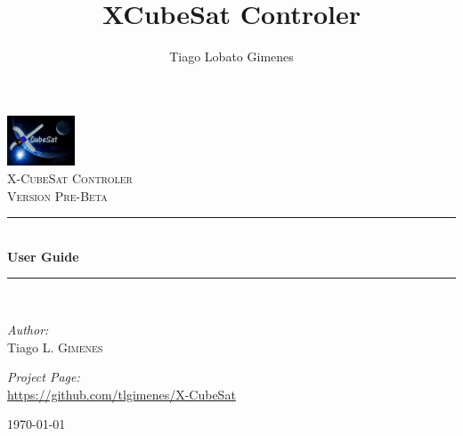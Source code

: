 \documentclass[pdftex,11pt,a4paper,titlepage]{report}
\author{Tiago Lobato Gimenes}
\title{XCubeSat Controler}
\newcommand{\HRule}{\rule{\linewidth}{0.5mm}}
\begin{document}
\begin{titlepage}
\begin{center}

\includegraphics[width=0.15\textwidth]{../images/CubeSat3.jpg}~\\[1cm]

\textsc{\LARGE X-CubeSat Controler}\\[1.5cm]

\textsc{\Large Version Pre-Beta}\\[0.5cm]

\HRule \\[0.4cm]
{ \huge \bfseries User Guide \\[0.4cm] }

\HRule \\[1.5cm]

\begin{minipage}{0.4\textwidth}
\begin{flushleft} \large
\emph{Author:}\\
Tiago \textsc{L. Gimenes}
\end{flushleft}
\end{minipage}
\begin{minipage}{0.4\textwidth}
\begin{flushright} \large
\emph{Project Page:} \\
\url{https://github.com/tlgimenes/X-CubeSat}
\end{flushright}
\end{minipage}

\vfill

{\large \today}

\end{center}
\end{titlepage}

\tableofcontents
\newpage

\end{document}
